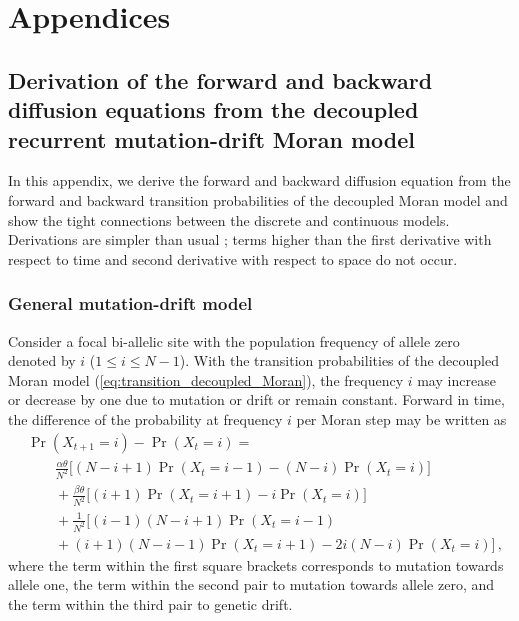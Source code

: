 \documentclass[preprint]{elsarticle}
\newcommand\x[1]{\ensuremath{X_{#1}}}
\begin{document}
{\section{Appendices}

\subsection{Derivation of the forward and backward diffusion equations from the decoupled recurrent mutation-drift Moran model}\label{sectioin:diffDer}

In this appendix, we derive the forward and backward diffusion equation from the forward and backward transition probabilities of the decoupled Moran model and show the tight connections between the discrete and continuous models. Derivations are simpler than usual \citep{Ewen04}; terms higher than the first derivative with respect to time and second derivative with respect to space do not occur. 

\subsubsection{General mutation-drift model}
Consider a focal bi-allelic site with the population frequency of allele zero denoted by $i$ ($1 \leq i \leq N-1$). With the transition probabilities of the decoupled Moran model (\ref{eq:transition_decoupled_Moran}), the frequency $i$ may increase or decrease by one due to mutation or drift or remain constant. Forward in time, the difference of the probability at frequency $i$ per Moran step may be written as
\begin{equation}\label{eq:forw_discr_mutation}
\begin{split}
&\Pr(\x{t+1}=i)-\Pr(\x{t}=i) = \\
&\qquad \frac{\alpha\theta}{N^2} \bigg[(N-i+1)\Pr(\x{t}=i-1) - (N-i)\Pr(\x{t}=i)\bigg]\\
&\qquad+\frac{\beta\theta}{N^2} \bigg[(i+1)\Pr(\x{t}=i+1) - i\Pr(\x{t}=i)\bigg]\\
&\qquad+\frac1{N^2}\bigg[(i-1)(N-i+1)\Pr(\x{t}=i-1) \\
&\qquad+ (i+1)(N-i-1)\Pr(\x{t}=i+1)-2i(N-i)\Pr(\x{t}=i)\bigg]\,,
\end{split}
\end{equation}
where the term within the first square brackets corresponds to mutation towards allele one, the term within the second pair to mutation towards allele zero, and the term within the third pair to genetic drift.

}
\end{document}
